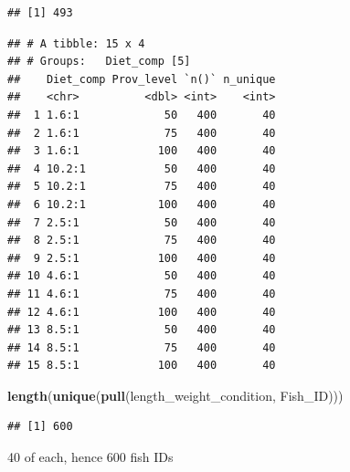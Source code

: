 \documentclass[]{book}
\newenvironment{Shaded}{\begin{snugshade}}{\end{snugshade}}
\newcommand{\DataTypeTok}[1]{\textcolor[rgb]{0.13,0.29,0.53}{#1}}
\newcommand{\KeywordTok}[1]{\textcolor[rgb]{0.13,0.29,0.53}{\textbf{#1}}}
\newcommand{\NormalTok}[1]{#1}
\newcommand{\OperatorTok}[1]{\textcolor[rgb]{0.81,0.36,0.00}{\textbf{#1}}}
\newcommand{\StringTok}[1]{\textcolor[rgb]{0.31,0.60,0.02}{#1}}
\begin{document}
\begin{verbatim}
## [1] 493
\end{verbatim}

\begin{Shaded}
\end{Shaded}

\begin{verbatim}
## # A tibble: 15 x 4
## # Groups:   Diet_comp [5]
##    Diet_comp Prov_level `n()` n_unique
##    <chr>          <dbl> <int>    <int>
##  1 1.6:1             50   400       40
##  2 1.6:1             75   400       40
##  3 1.6:1            100   400       40
##  4 10.2:1            50   400       40
##  5 10.2:1            75   400       40
##  6 10.2:1           100   400       40
##  7 2.5:1             50   400       40
##  8 2.5:1             75   400       40
##  9 2.5:1            100   400       40
## 10 4.6:1             50   400       40
## 11 4.6:1             75   400       40
## 12 4.6:1            100   400       40
## 13 8.5:1             50   400       40
## 14 8.5:1             75   400       40
## 15 8.5:1            100   400       40
\end{verbatim}

\begin{Shaded}
\begin{Highlighting}[]
\KeywordTok{length}\NormalTok{(}\KeywordTok{unique}\NormalTok{(}\KeywordTok{pull}\NormalTok{(length_weight_condition, Fish_ID)))}
\end{Highlighting}
\end{Shaded}

\begin{verbatim}
## [1] 600
\end{verbatim}

40 of each, hence 600 fish IDs

\begin{Shaded}
\end{Shaded}
\end{document}
